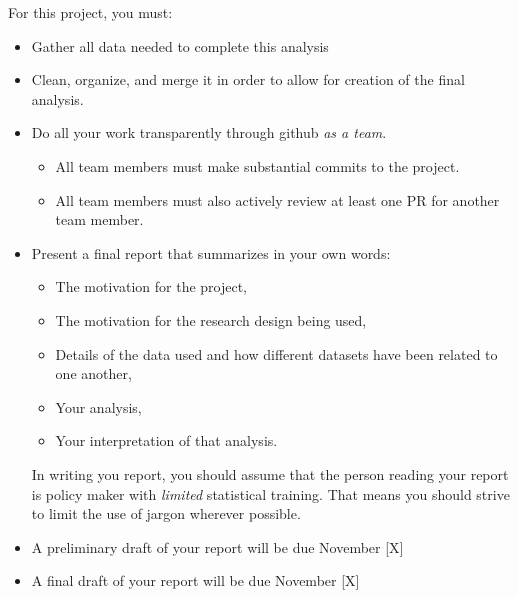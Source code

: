 \documentclass[12pt]{article}
\begin{document}
For this project, you must:

\begin{itemize}
  \item Gather all data needed to complete this analysis
  \item Clean, organize, and merge it in order to allow for creation of the final analysis.
  \item Do all your work transparently through github \emph{as a team}.
  \begin{itemize}
    \item All team members must make substantial commits to the project.
    \item All team members must also actively review at least one PR for another team member.
  \end{itemize}
  \item Present a final report that summarizes in your own words:
  \begin{itemize}
    \item The motivation for the project,
    \item The motivation for the research design being used,
    \item Details of the data used and how different datasets have been related to one another,
    \item Your analysis,
    \item Your interpretation of that analysis.
  \end{itemize}
  In writing you report, you should assume that the person reading your report is policy maker with \emph{limited} statistical training. That means you should strive to limit the use of jargon wherever possible.
  \item A preliminary draft of your report will be due November [X]
  \item A final draft of your report will be due November [X]
\end{itemize}
\end{document}
